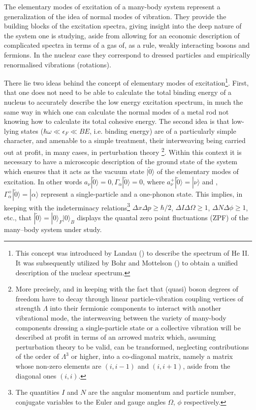 The elementary modes of excitation  of a many-body system  represent a generalization of  the idea of normal modes of vibration.
They provide the building blocks of the excitation spectra, giving  insight  into the  deep nature  of the system one is studying, aside from allowing 
for an economic description  of complicated spectra in terms of a gas of, as a rule, weakly interacting bosons and fermions. In the nuclear case 
they correspond to dressed particles and empirically renormalised vibrations (rotations).

There lie two ideas behind the concept of elementary modes of excitation\footnote{This concept was introduced by Landau (\cite{Landau:41}) to describe the spectrum of He II. It was subsequently utilized by Bohr and Mottelson (\cite{Bohr:75}) to obtain a unified description of the nuclear spectrum.}. First, that one does not need to be able to calculate the total binding
energy  of a nucleus to accurately describe the low energy excitation spectrum, in much the same way in which one can calculate 
the normal modes of a metal rod not knowing how to  calculate its total cohesive energy.
The second idea is that low-lying states ($\hbar \omega \ll \epsilon_F \ll BE$, i.e. binding energy) are of a particularly simple
character, and  amenable to a simple treatment, their
interweaving  being carried out at profit, in many cases,  in perturbation theory
\footnote{More precisely, and in keeping with  the fact that (quasi)
boson degrees of freedom have to decay through linear particle-vibration 
coupling vertices of strength $\Lambda$ into their fermionic components to interact with another vibrational mode,
the interweaving between the variety of many-body components dressing a single-particle state 
or a collective vibration will be described at profit in terms of an arrowed matrix which, assuming perturbation theory
to be valid, can be transformed, neglecting contributions of the order of $\Lambda^3$ or higher, into a co-diagonal matrix, namely a matrix 
whose non-zero elements are $(i,i-1)$ and $(i,i+1)$,  aside from  the diagonal ones $(i,i)$.}. 
Within this context it is  necessary to have a microscopic description 
of the ground  state of the system  which ensures that it acts as the vacuum state 
$|\tilde0\rangle  $ of the elementary modes of excitation. In other words $a_{\nu}|\tilde 0 \rangle   = 0, \Gamma_{\alpha} |\tilde 0\rangle   =0$, where
$a^+_{\nu}|\tilde 0 \rangle   = |\nu\rangle  $ and , $\Gamma^+_{\alpha} |\tilde 0\rangle   =|\alpha\rangle  $ represent a single-particle and a one-phonon state.
This   implies, in keeping 
with the indeterminacy  relations\footnote{The quantities $I$ and $N$   are the angular momentum and particle number, conjugate variables to the Euler and gauge angles $\Omega$, $\phi$ respectively.} $\Delta x \Delta p \geq \hbar/2$, $\Delta I \Delta \Omega \geq 1$, $\Delta N \Delta \phi \geq 1$, etc.,  that $|\tilde 0\rangle   = |0\rangle  _F |0\rangle  _B$
displays the  quantal zero point fluctuations (ZPF) of the many--body system under study.


